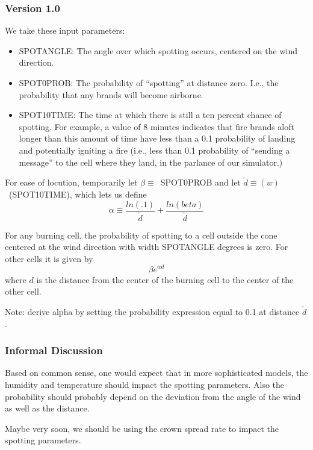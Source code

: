 \documentclass[11pt]{article}
\begin{document}
\subsubsection{Version 1.0}

We take these input parameters:

\begin{itemize}
\item SPOTANGLE: The angle over which spotting occurs, centered on the wind direction.
\item SPOT0PROB: The probability of ``spotting'' at distance zero. I.e., the probability that any brands will become airborne.
\item SPOT10TIME: The time at which there is still a ten percent chance of
  spotting. For example, a value of 8 minutes indicates that fire brands
  aloft longer than this amount of time have less than a 0.1 probability
  of landing and potentially igniting a fire (i.e., less than 0.1 probability
  of ``sending a message''
  to the cell where they land, in the parlance of our simulator.)
\end{itemize}

For ease of locution, temporarily let $\beta \equiv$~SPOT0PROB and let
$\tilde{d} \equiv (w)$~(SPOT10TIME), which lets us define
$$
\alpha \equiv \frac{ln(.1)}{\tilde{d}} + \frac{ln(beta)}{\tilde{d}} 
$$

For any burning cell, the probability of spotting to a cell
outside the cone centered at the wind direction with
width SPOTANGLE degrees is zero. For other cells it is given
by
$$
\beta e^{\alpha d}
$$
where $d$ is the distance from the center of the burning cell
to the center of the other cell.

Note: derive alpha by setting the probability expression equal to 0.1
at distance $\tilde{d}$.

\subsubsection{Informal Discussion}

Based on common sense, one would expect that in more sophisticated
models, the humidity and temperature should impact the spotting
parameters. Also the probability should probably depend on the
deviation from the angle of the wind as well as the distance.

Maybe very soon, we should be using the crown spread rate to
impact the spotting parameters.
\end{document}
